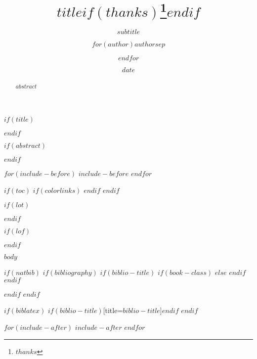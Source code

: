 \documentclass[$fontsize$,a4paper]{article}
\title{$title$$if(thanks)$\thanks{$thanks$}$endif$}
\subtitle{$subtitle$}
\author{$for(author)$$author$$sep$ \and $endfor$}
\institute{$for(institute)$$institute$$sep$ \and $endfor$}
\date{$date$}
\begin{document}
$if(title)$
	\maketitle
$endif$

$if(abstract)$
\begin{abstract}
$abstract$
\end{abstract}
$endif$

$for(include-before)$
	$include-before$
$endfor$

$if(toc)$
{
	$if(colorlinks)$
	\hypersetup{linkcolor=$if(toccolor)$$toccolor$$else$black$endif$}
	$endif$
	\setcounter{tocdepth}{$toc-depth$}
	\tableofcontents
}
$endif$

$if(lot)$
\listoftables
$endif$

$if(lof)$
\listoffigures
$endif$

$body$

$if(natbib)$
$if(bibliography)$
$if(biblio-title)$
$if(book-class)$
\renewcommand\bibname{$biblio-title$}
$else$
\renewcommand\refname{$biblio-title$}
$endif$
$endif$

$endif$
$endif$

$if(biblatex)$
\printbibliography$if(biblio-title)$[title=$biblio-title$]$endif$
$endif$

$for(include-after)$
$include-after$
$endfor$
\end{document}

